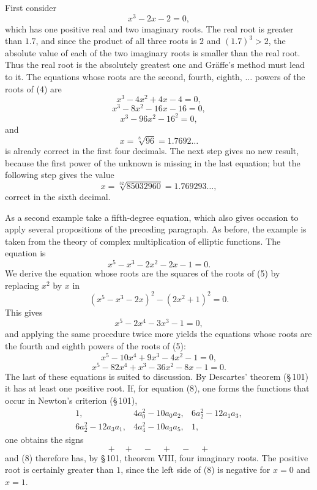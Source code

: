 \documentclass[11pt]{article}
\begin{document}
First consider
\begin{equation}
        x^3-2x-2=0,
\tag{4}
\end{equation}
which has one positive real and two imaginary roots. The real root is greater than $1.7$, and since the product of all three roots is $2$ and $(1.7)^3>2$, the absolute value of each of the two imaginary roots is smaller than the real root. Thus the real root is the absolutely greatest one and Gräffe's method must lead to it. The equations whose roots are the second, fourth, eighth, $\ldots$ powers of the roots of (4) are
\[
        x^3-4x^2+4x-4=0,
\]
\[
        x^3-8x^2-16x-16=0,
\]
\[
        x^3-96x^2-16^2=0,
\]
and
\[
        x=\sqrt[8]{96}=1.7692\ldots
\]
is already correct in the first four decimals. The next step gives no new result, because the first power of the unknown is missing in the last equation; but the following step gives the value
\[
        x=\sqrt[32]{85032960}=1.769293\ldots,
\]
correct in the sixth decimal.

As a second example take a fifth-degree equation, which also gives occasion to apply several propositions of the preceding paragraph. As before, the example is taken from the theory of complex multiplication of elliptic functions. The equation is
\begin{equation}
        x^5-x^3-2x^2-2x-1=0.
\tag{5}
\end{equation}
We derive the equation whose roots are the squares of the roots of (5) by replacing $x^2$ by $x$ in
\[
        (x^5-x^3-2x)^2-(2x^2+1)^2=0.
\]
This gives
\begin{equation}
        x^5-2x^4-3x^3-1=0,
\tag{6}
\end{equation}
and applying the same procedure twice more yields the equations whose roots are the fourth and eighth powers of the roots of (5):
\begin{equation}
        x^5-10x^4+9x^3-4x^2-1=0,
\tag{7}
\end{equation}
\begin{equation}
        x^5-82x^4+x^3-36x^2-8x-1=0.
\tag{8}
\end{equation}
The last of these equations is suited to discussion. By Descartes' theorem (\S\,101) it has at least one positive root. If, for equation (8), one forms the functions that occur in Newton's criterion (\S\,101),
\[
\begin{array}{cccccc}
1,&4a_0^2-10a_0a_2,&6a_2^2-12a_1a_3,\\
6a_2^2-12a_3a_1,&4a_4^2-10a_3a_5,&1,
\end{array}
\]
one obtains the signs
\[
        +\quad+\quad-\quad+\quad-\quad+
\]
and (8) therefore has, by \S\,101, theorem VIII, four imaginary roots. The positive root is certainly greater than $1$, since the left side of (8) is negative for $x=0$ and $x=1$.
\end{document}
